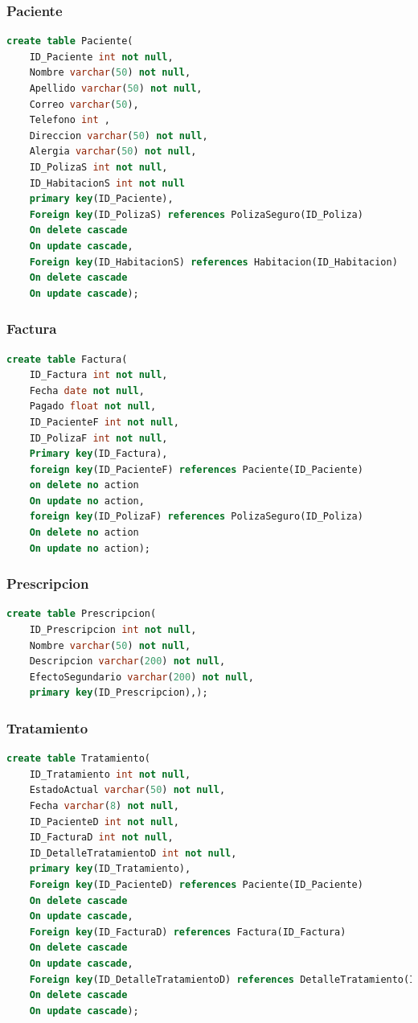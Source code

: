 \documentclass[10pt,letterpaper]{book}
\begin{document}
\subsubsection{Paciente}
\begin{lstlisting}[language=sql]
create table Paciente(
	ID_Paciente int not null,
	Nombre varchar(50) not null,
	Apellido varchar(50) not null,
	Correo varchar(50),
	Telefono int ,
	Direccion varchar(50) not null,
	Alergia varchar(50) not null,
	ID_PolizaS int not null,
	ID_HabitacionS int not null
	primary key(ID_Paciente),
	Foreign key(ID_PolizaS) references PolizaSeguro(ID_Poliza)
	On delete cascade
	On update cascade,
	Foreign key(ID_HabitacionS) references Habitacion(ID_Habitacion)
	On delete cascade
	On update cascade);
\end{lstlisting}
\subsubsection{Factura}
\begin{lstlisting}[language=sql]
create table Factura(
	ID_Factura int not null,
	Fecha date not null,
	Pagado float not null,
	ID_PacienteF int not null,
	ID_PolizaF int not null,
	Primary key(ID_Factura),
	foreign key(ID_PacienteF) references Paciente(ID_Paciente)
	on delete no action
	On update no action,
	foreign key(ID_PolizaF) references PolizaSeguro(ID_Poliza)
	On delete no action
	On update no action);
\end{lstlisting}
\subsubsection{Prescripcion}
\begin{lstlisting}[language=sql]
create table Prescripcion(
	ID_Prescripcion int not null,
	Nombre varchar(50) not null,
	Descripcion varchar(200) not null,
	EfectoSegundario varchar(200) not null,
	primary key(ID_Prescripcion),);
\end{lstlisting}
\subsubsection{Tratamiento}
\begin{lstlisting}[language=sql]
create table Tratamiento(
	ID_Tratamiento int not null,
	EstadoActual varchar(50) not null,
	Fecha varchar(8) not null,
	ID_PacienteD int not null,
	ID_FacturaD int not null,
	ID_DetalleTratamientoD int not null,
	primary key(ID_Tratamiento),
	Foreign key(ID_PacienteD) references Paciente(ID_Paciente)
	On delete cascade
	On update cascade,
	Foreign key(ID_FacturaD) references Factura(ID_Factura)
	On delete cascade
	On update cascade,
	Foreign key(ID_DetalleTratamientoD) references DetalleTratamiento(ID_DetalleTratamiento)
	On delete cascade
	On update cascade);
\end{lstlisting}
\end{document}

